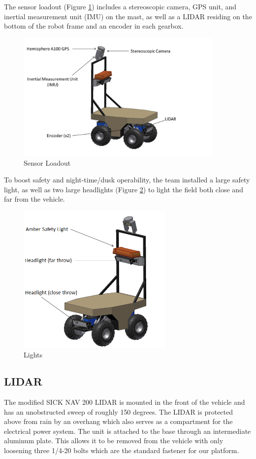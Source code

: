The sensor loadout (Figure \ref{FIG:sensors}) includes a stereoscopic camera, GPS unit, and inertial measurement unit (IMU) on the mast, as well as a LIDAR residing on the bottom of the robot frame and an encoder in each gearbox.

\begin{figure}[H]
\begin{center}
\includegraphics[width=4in]{./Pics/Sensors.png}
\caption{Sensor Loadout}
\label{FIG:sensors}
\end{center}
\end{figure}

To boost safety and night-time/dusk operability, the team installed a large safety light, as well as two large headlights (Figure \ref{FIG:lights}) to light the field both close and far from the vehicle.

\begin{figure}[H]
\begin{center}
\includegraphics[width=3in]{./Pics/Lighting.png}
\caption{Lights}
\label{FIG:lights}
\end{center}
\end{figure}


\subsection{LIDAR}
The modified SICK NAV 200 LIDAR is mounted in the front of the vehicle and has an unobstructed sweep of roughly 150 degrees. The LIDAR is protected above from rain by an overhang which also serves as a compartment for the electrical power system. The unit is attached to the base through an intermediate aluminum plate. This allows it to be removed from the vehicle with only loosening three 1/4-20 bolts which are the standard fastener for our platform.
